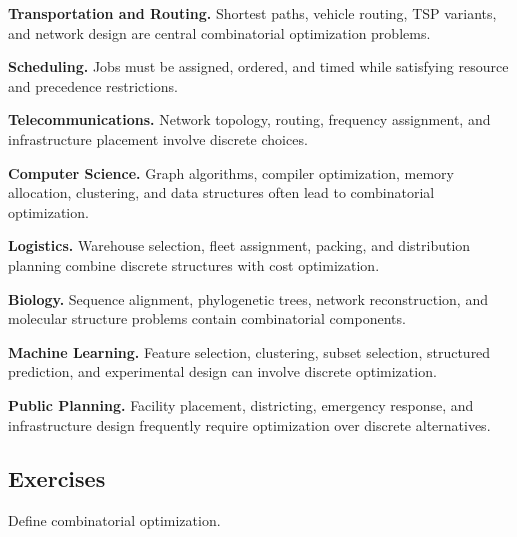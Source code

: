\begin{applicationbox}

\textbf{Transportation and Routing.}
Shortest paths, vehicle routing, TSP variants, and network design are
central combinatorial optimization problems.

\medskip

\textbf{Scheduling.}
Jobs must be assigned, ordered, and timed while satisfying resource and
precedence restrictions.

\medskip

\textbf{Telecommunications.}
Network topology, routing, frequency assignment, and infrastructure
placement involve discrete choices.

\medskip

\textbf{Computer Science.}
Graph algorithms, compiler optimization, memory allocation, clustering,
and data structures often lead to combinatorial optimization.

\medskip

\textbf{Logistics.}
Warehouse selection, fleet assignment, packing, and distribution planning
combine discrete structures with cost optimization.

\medskip

\textbf{Biology.}
Sequence alignment, phylogenetic trees, network reconstruction, and
molecular structure problems contain combinatorial components.

\medskip

\textbf{Machine Learning.}
Feature selection, clustering, subset selection, structured prediction,
and experimental design can involve discrete optimization.

\medskip

\textbf{Public Planning.}
Facility placement, districting, emergency response, and infrastructure
design frequently require optimization over discrete alternatives.

\end{applicationbox}

\subsection{Exercises}
\label{subsec:combinatorial-optimization-exercises}

\begin{exercise}[1]
Define combinatorial optimization.
\end{exercise}


